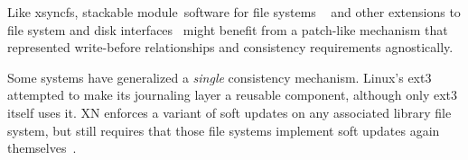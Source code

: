 \documentclass[9pt,twocolumn,letterpaper]{article}
\newcommand{\Kudos}{Featherstitch}
\newcommand{\patches}{patches}
\newcommand{\module}{module}
\newcommand{\modules}{modules}
\begin{document}
%
%
%
%
Like xsyncfs, stackable \module\ software for file systems%
~\cite{rosenthal90evolving, skinner93stacking,
heidemann94filesystem,zadok99extending,
zadok00fist,wright03ncryptfs,wright06versatility} and other extensions
to file system and disk interfaces~\cite{huang05fs2,sivathanu06typesafe}
might
benefit from a patch-like mechanism that represented write-before
relationships and consistency requirements agnostically.

Some systems have generalized a \emph{single} consistency mechanism.
Linux's ext3 attempted to make its journaling layer a reusable component,
although only ext3 itself uses it.  XN enforces a variant of soft updates
on any associated library file system, but still requires that those file
systems implement soft updates again themselves~\cite{kaashoek97application}.

\begin{comment}
Previous
systems like FiST~\cite{zadok00fist} or GEOM~\cite{geom} generally focus on
an individual portion of the system and thus restrict both what a \module\
can do and how \modules\ can be arranged. FiST, for instance, does not
provide a way to deal with structures on the disk directly -- it provides
only ``wrapper'' functionality around existing file
systems. %
GEOM, on the other hand, deals only with the block device layer, and has no
way to work with the file systems stored on those block devices. Neither
has a formal way of specifying or honoring complex write-ordering
information, which is what \patches\ in \Kudos\ provide. We imagine that
systems like these could be adapted to work with \patches, giving the
benefits of both ideas.

\paragraph{Applications}

A variety of extensions to file systems and disk interfaces have been proposed
in recent work, like the FS2 Free Space File System~\cite{huang05fs2},
encrypting file systems like NCryptfs~\cite{wright03ncryptfs}, and type-safe
disks~\cite{sivathanu06typesafe}. The \Kudos\
\module\ system may provide an interesting platform for implementations 
of these ideas.
\end{comment}
\end{document}
